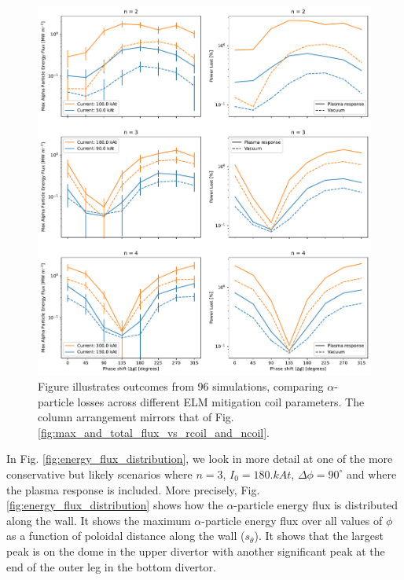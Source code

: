 \documentclass[10pt, a4paper, twoside]{article}
\begin{document}
\begin{figure}[!htb]
    \centering
    \includegraphics[width=0.99\linewidth]{Figures/max_and_total_flux_vs_phase.pdf}
    \caption{Figure illustrates outcomes from 96 simulations, comparing $\alpha$-particle losses across different ELM mitigation coil parameters. The column arrangement mirrors that of Fig. \ref{fig:max_and_total_flux_vs_rcoil_and_ncoil}.}
    \label{fig:max_and_total_flux_vs_phase}
\end{figure}

In Fig. \ref{fig:energy_flux_distribution}, we look in more detail at one of the more conservative but likely scenarios where $n=3$, $I_0= 180\si{.kAt}$, $\Delta \phi = 90^\circ$ and where the plasma response is included. More precisely, Fig. \ref{fig:energy_flux_distribution} shows how the $\alpha$-particle energy flux is distributed along the wall. It shows the maximum $\alpha$-particle energy flux over all values of $\phi$ as a function of poloidal distance along the wall ($s_\theta$). It shows that the largest peak is on the dome in the upper divertor with another significant peak at the end of the outer leg in the bottom divertor.
\end{document}
